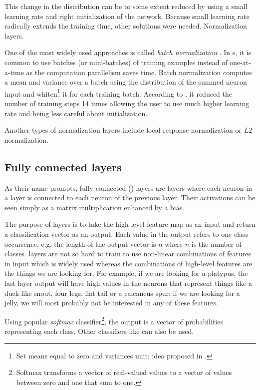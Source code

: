 This change in the distribution can be to some extent reduced by using a small 
learning rate and right initialization of the network. Because small learning 
rate radically extends the training time, other solutions were needed. 
Normalization layers. 

One of the most widely used approaches is called \textit{batch normalization} 
\cite{batch-norm}. In s, it is common to use batches (or mini-batches) 
of training examples instead of one-at-a-time as the computation parallelism 
saves time. Batch normalization computes a mean and variance over a batch using 
the distribution of the summed neuron input and whiten\footnote{Set means equal 
to zero and variances unit; idea proposed in \cite{tricks}.} it for each 
training batch. According to \cite{batch-norm}, it reduced the number of 
training steps 14 times allowing the user to use much higher learning rate and 
being less careful about initialization.

Another types of normalization layers include local response normalization or 
$L2$ normalization.

\subsection{Fully connected layers}
\label{fc-layers}

As their name prompts, fully connected () layers are layers where each 
neuron in a layer is connected to each neuron of the previous layer. Their 
activations can be seen simply as a matrix multiplication enhanced by a bias.  

The purpose of  layers is to take the high-level feature map as an input 
and return a classification vector as an output. Each value in the output refers 
to one class occurrence, e.g. the length of the output vector is $n$ where $n$ 
is the number of classes.  layers are not so hard to train to use 
non-linear combinations of features in input which is widely used whereas the 
combinations of high-level features are the things we are looking for. For 
example, if we are looking for a platypus, the last layer output will have high 
values in the neurons that represent things like a duck-like snout, four legs, 
flat tail or a calcaneus spur; if we are looking for a jelly, we will most 
probably not be interested in any of these features. 

Using popular \textit{softmax} classifier\footnote{Softmax transforms a vector 
of real-valued values to a vector of values between zero and one that sum to 
one.}, the output is a vector of probabilities representing each class. Other 
classifiers like  can also be used. 

